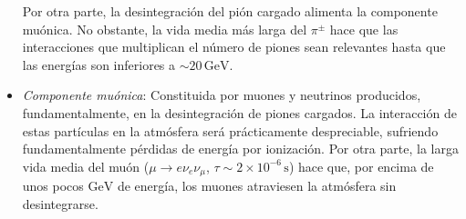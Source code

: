 \documentclass[12 pt, a4paper]{article} %
\numberwithin{equation}{section}
\numberwithin{figure}{section}
\numberwithin{table}{section}
\begin{document}
\begin{itemize}
Por otra parte, la desintegración del pión cargado alimenta la componente muónica. No obstante, la vida media más larga del $\pi^\pm$ hace que las interacciones que multiplican el número de piones sean relevantes hasta que las energías son inferiores a $\sim 20\,\mathrm{GeV}$.
	\item\textit{Componente muónica}: Constituida por muones y neutrinos producidos, fundamentalmente, en la desintegración de piones cargados. La interacción de estas partículas en la atmósfera será prácticamente despreciable, sufriendo fundamentalmente pérdidas de energía por ionización. Por otra parte, la larga vida media del muón ($\mu\rightarrow e\nu_e\nu_\mu$, $\tau\sim2\times10^{-6}\,\mathrm{s}$) hace que, por encima de unos pocos $\mathrm{GeV}$ de energía, los muones atraviesen la atmósfera sin desintegrarse.
\end{itemize}
\end{document}
